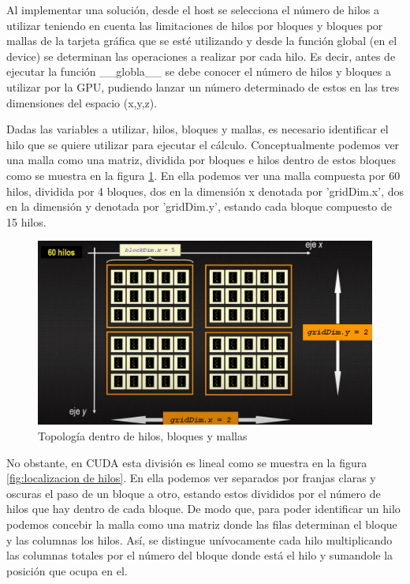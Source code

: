 \documentclass[11pt,a4paper,twoside,pdf]{article}
\numberwithin{equation}{section}
\begin{document}
Al implementar una solución, desde el host se selecciona el número de hilos a utilizar teniendo en cuenta las limitaciones de hilos por bloques y bloques por mallas de la tarjeta gráfica que se esté utilizando y desde la función global (en el device) se determinan las operaciones a realizar por cada hilo. Es decir, antes de ejecutar la función \_\_globla\_\_ se debe conocer el número de hilos y bloques a utilizar por la GPU, pudiendo lanzar un número determinado de estos en las tres dimensiones del espacio (x,y,z).

Dadas las variables a utilizar, hilos, bloques y mallas, es necesario identificar el hilo que se quiere utilizar para ejecutar el cálculo. Conceptualmente podemos ver una malla como una matriz, dividida por bloques e hilos dentro de estos bloques como se muestra en la figura \ref{fig:hilos, bloques y mallas en gpu}. En ella podemos ver una malla compuesta por 60 hilos, dividida por 4 bloques, dos en la dimensión x denotada por 'gridDim.x', dos en la dimensión y denotada por 'gridDim.y', estando cada bloque compuesto de 15 hilos.

\begin{figure}[h]
\centering
\includegraphics[width=10 cm]{Nvidia_Topologia_virtual.jpg}				
\caption{Topología dentro de hilos, bloques y mallas \cite{web} }
\label{fig:hilos, bloques y mallas en gpu}
\end{figure}
\noindent

No obstante, en CUDA esta división es lineal como se muestra en la figura \ref{fig:localizacion de hilos}. En ella podemos ver separados por franjas claras y oscuras el paso de un bloque a otro, estando estos divididos por el número de hilos que hay dentro de cada bloque. De modo que, para poder identificar un hilo podemos concebir la malla como una matriz donde las filas determinan el bloque y las columnas los hilos. Así, se distingue unívocamente cada hilo multiplicando las columnas totales por el número del bloque donde está el hilo y sumandole la posición que ocupa en el.
\end{document}
